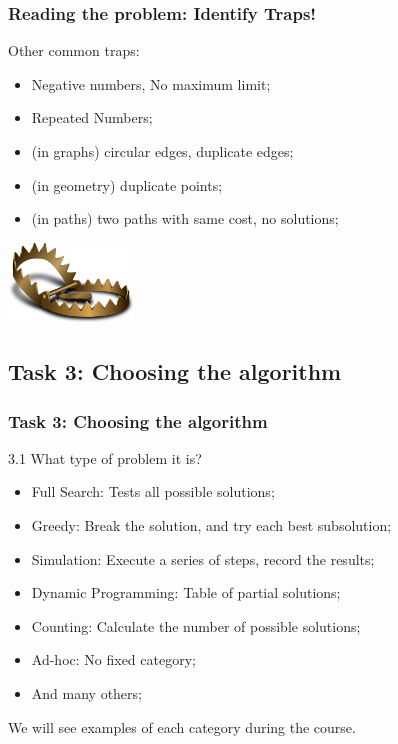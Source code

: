 \documentclass{beamer}
\begin{document}
\begin{frame}
  \frametitle{Reading the problem: Identify Traps!}
  Other common traps:
  \begin{itemize}
  \item Negative numbers, No maximum limit;
  \item Repeated Numbers;
  \item (in graphs) circular edges, duplicate edges;
  \item (in geometry) duplicate points;
  \item (in paths) two paths with same cost, no solutions;
  \end{itemize}

  \hfill \includegraphics[width=0.25\textwidth]{../img/trap}
\end{frame}

\subsection{Task 3: Choosing the algorithm}

\begin{frame}
  \frametitle{Task 3: Choosing the algorithm}
  \begin{block}{3.1 What type of problem it is?}
    \begin{itemize}
    \item Full Search: Tests all possible solutions;
    \item Greedy: Break the solution, and try each best subsolution;
    \item Simulation: Execute a series of steps, record the results;
    \item Dynamic Programming: Table of partial solutions;
    \item Counting: Calculate the number of possible solutions;
    \item Ad-hoc: No fixed category;
    \item And many others;
    \end{itemize}
  \end{block}

  \bigskip

  We will see examples of each category during the course.
\end{frame}
\end{document}
